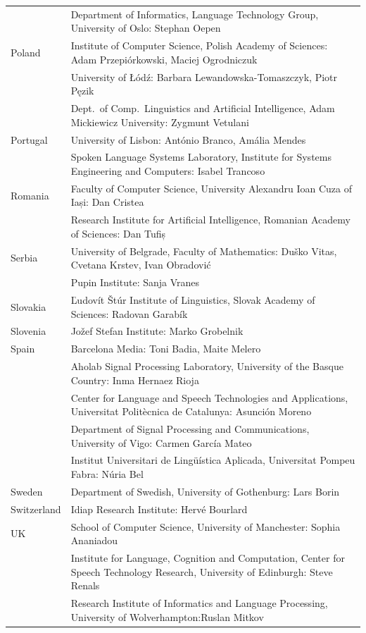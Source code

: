 \documentclass[]{../../metanetpaper}
\begin{document}
\begin{longtable}{@{}lp{137mm}@{}}
& Department of Informatics, Language Technology Group, University of Oslo:  Stephan Oepen \\ \addlinespace
Poland & Institute of Computer Science, Polish Academy of Sciences: Adam Przepiórkowski, Maciej Ogrodniczuk \\ \addlinespace
& University of Łódź: Barbara Lewandowska-Tomaszczyk, Piotr Pęzik\\ \addlinespace
& Dept.~of Comp.~Linguistics and Artificial Intelligence, Adam Mickiewicz University: Zygmunt Vetulani \\ \addlinespace
Portugal & University of Lisbon: António Branco, Amália Mendes \\ \addlinespace 
& Spoken Language Systems Laboratory, Institute for Systems Engineering and Computers: Isabel Trancoso \\ \addlinespace
Romania & Faculty of Computer Science, University Alexandru Ioan Cuza of Iași: Dan Cristea \\ \addlinespace
& Research Institute for Artificial Intelligence, Romanian Academy of Sciences:  Dan Tufiș \\ \addlinespace
Serbia  & University of Belgrade, Faculty of Mathematics: Duško Vitas, Cvetana Krstev,  Ivan Obradović \\ \addlinespace
& Pupin Institute: Sanja Vranes \\ \addlinespace  
Slovakia & Ľudovít Štúr Institute of Linguistics, Slovak Academy of Sciences: Radovan Garabík \\ \addlinespace 
Slovenia & Jožef Stefan Institute: Marko Grobelnik \\ \addlinespace 
Spain & Barcelona Media: Toni Badia, Maite Melero \\ \addlinespace  
& Aholab Signal Processing Laboratory, University of the Basque Country:  Inma Hernaez Rioja \\ \addlinespace 
& Center for Language and Speech Technologies and Applications, Universitat Politècnica de Catalunya:  Asunción Moreno \\ \addlinespace 
& Department of Signal Processing and Communications, University of Vigo:  Carmen García Mateo \\ \addlinespace 
& Institut Universitari de Lingüística Aplicada, Universitat Pompeu Fabra: Núria Bel \\ \addlinespace 
Sweden & Department of Swedish, University of Gothenburg: Lars Borin \\ \addlinespace 
Switzerland & Idiap Research Institute: Hervé Bourlard \\ \addlinespace 
UK & School of Computer Science, University of Manchester: Sophia Ananiadou \\ \addlinespace  & Institute for Language, Cognition and Computation, Center for Speech Technology Research, University of Edinburgh: Steve Renals \\ \addlinespace 
& Research Institute of Informatics and Language Processing, University of Wolverhampton:\newline Ruslan Mitkov \\ 
\end{longtable}
\normalsize
\end{document}
